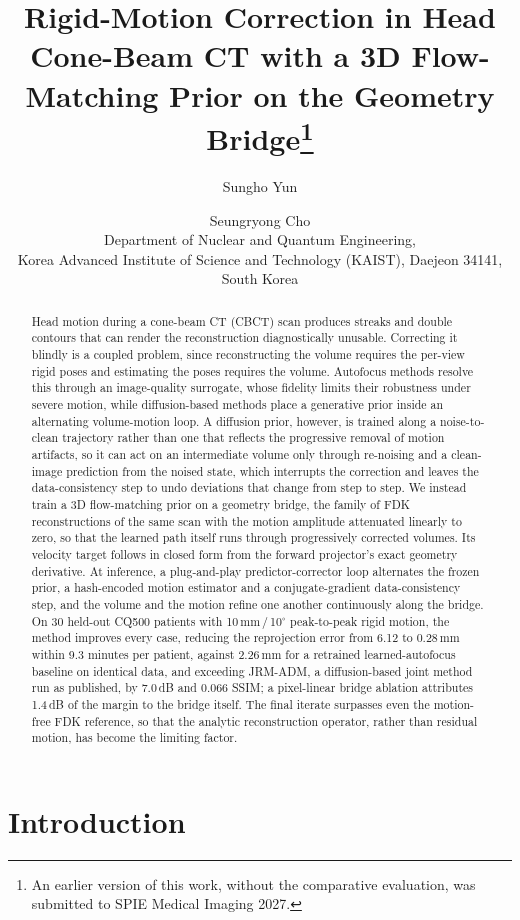 \documentclass[11pt]{article}
\title{\bfseries Rigid-Motion Correction in Head Cone-Beam CT with a 3D Flow-Matching
Prior on the Geometry Bridge\thanks{An earlier version of this work, without the comparative evaluation, was submitted to SPIE Medical Imaging 2027.}}
\author{%
Sungho Yun \and Seungryong Cho\\[2pt]
{\normalsize Department of Nuclear and Quantum Engineering,}\\
{\normalsize Korea Advanced Institute of Science and Technology (KAIST), Daejeon 34141, South Korea}}
\date{}
\begin{document}
\maketitle

\begin{abstract}
\noindent
Head motion during a cone-beam CT (CBCT) scan produces streaks and double contours that
can render the reconstruction diagnostically unusable. Correcting it blindly is a coupled
problem, since reconstructing the volume requires the per-view rigid poses and estimating
the poses requires the volume. Autofocus methods resolve this through an image-quality
surrogate, whose fidelity limits their robustness under severe motion, while
diffusion-based methods place a generative prior inside an alternating volume-motion loop.
A diffusion prior, however, is trained along a noise-to-clean trajectory rather than one
that reflects the progressive removal of motion artifacts, so it can act on an
intermediate volume only through re-noising and a clean-image prediction from the noised
state, which interrupts the correction and leaves the data-consistency step to undo
deviations that change from step to step. We
instead train a 3D flow-matching prior on a geometry bridge, the family of FDK
reconstructions of the same scan with the motion amplitude attenuated linearly to zero,
so that the learned path itself runs through progressively corrected volumes. Its
velocity target follows in closed form from the forward projector's exact geometry
derivative. At inference, a plug-and-play predictor-corrector loop alternates the frozen
prior, a hash-encoded motion estimator and a conjugate-gradient data-consistency step, and
the volume and the motion refine one another continuously along the bridge. On 30
held-out CQ500 patients with 10\,mm\,/\,10$^\circ$ peak-to-peak rigid motion, the method
improves every case, reducing the reprojection error from 6.12 to 0.28\,mm within 9.3
minutes per patient, against 2.26\,mm for a retrained learned-autofocus baseline on
identical data, and exceeding JRM-ADM, a diffusion-based joint method run as published, by
7.0\,dB and 0.066 SSIM; a pixel-linear bridge ablation attributes
1.4\,dB of the margin to the bridge itself. The final
iterate surpasses even the motion-free FDK reference, so that the analytic reconstruction
operator, rather than residual motion, has become the limiting factor.
\end{abstract}

\section{Introduction}
\label{sec:intro}
\end{document}
